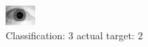 \begin{figure}[h!]
\begin{center}
\includegraphics[width=0.60\columnwidth]{figures/ID1687_class_3_target_2.png}
\end{center}
\caption{ Classification: 3 actual target: 2}
\label{fig:ID1687_class_3_target_2}
\end{figure}
